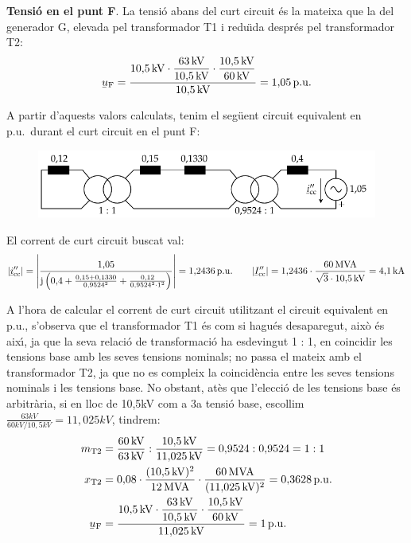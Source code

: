 \begin{exemple}
\textbf{Tensi\'{o} en el punt F}. La tensi\'{o} abans del curt circuit \'{e}s la mateixa que la del generador G, elevada pel transformador T1 i redu\"{\i}da despr\'{e}s pel transformador T2:
\[
\cmplx{u}\ped{F} = \frac{10{,}5\unit{kV} \cdot
\dfrac{63\unit{kV}}{10{,}5\unit{kV}} \cdot
\dfrac{10{,}5\unit{kV}}{60\unit{kV}}}{10{,}5\unit{kV}} =
1{,}05\unit{p.u.}
\]

A partir d'aquests valors calculats, tenim el seg\"{u}ent circuit equivalent en p.u.\ durant el
curt circuit en el punt F:
\begin{figure}[h]
\vspace{3mm} \centering
   \includegraphics{Imatges/Cap-CalcBas-pu-Circuit2.pdf}
\end{figure}


El corrent de curt circuit buscat val:
\[
|\cmplx{i}''\ped{cc}| = \left| \frac{1{,}05}{\ju \left( 0{,}4 + \frac{0{,}15 + 0{,}1330}{0{,}9524^2} + \frac{0{,}12}{0{,}9524^2 \cdot 1^2} \right)} \right| = 1{,}2436\unit{p.u.} \qquad |\cmplx{I}''\ped{cc}| = 1{,}2436\cdot\frac{60\unit{MVA}}{\sqrt{3}\cdot 10{,}5\unit{kV}} = 4{,}1\unit{kA}
\]

 A l'hora de calcular el corrent de curt circuit utilitzant el circuit equivalent en p.u.,
 s'observa que el transformador T1 \'{e}s com si hagu\'{e}s desaparegut,
 aix\`{o} \'{e}s aix\'{\i}, ja que la seva relaci\'{o} de transformaci\'{o} ha esdevingut
 1 : 1, en coincidir les tensions base amb les seves tensions nominals;
 no passa el mateix amb el transformador T2, ja que no es compleix
 la coincid\`{e}ncia entre les seves tensions nominals i les tensions
 base. No obstant, at\`{e}s que l'elecci\'{o} de les tensions base \'{e}s
 arbitr\`{a}ria, si en lloc de 10,5\unit{kV} com a 3a tensi\'{o} base,
 escollim
 $\frac{63\unit{kV}}{60\unit{kV} / 10{,}5\unit{kV}}=11{,}025\unit{kV}$,
 tindrem:
\begin{align*}
   m\ped{T2} &= \frac{60\unit{kV}}{63\unit{kV}} : \frac{10{,}5\unit{kV}}{11{,}025\unit{kV}}
   = 0{,}9524:0{,}9524 = 1:1 \\
   x\ped{T2} &= 0{,}08 \cdot \frac{(10{,}5\unit{kV})^2}{12\unit{MVA}} \cdot
   \frac{60\unit{MVA}}{(11{,}025\unit{kV})^2}  = 0{,}3628\unit{p.u.}\\
   \cmplx{u}\ped{F} &= \frac{10{,}5\unit{kV} \cdot \dfrac{63\unit{kV}}{10{,}5\unit{kV}} \cdot
   \dfrac{10{,}5\unit{kV}}{60\unit{kV}}}{11{,}025\unit{kV}} = 1\unit{p.u.}
\end{align*}


\end{exemple}
